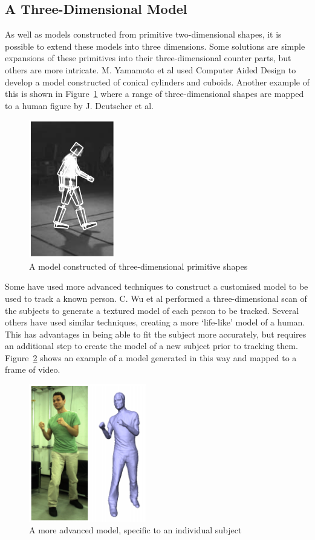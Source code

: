 \subsection{A Three-Dimensional Model}

As well as models constructed from primitive two-dimensional shapes, it is possible to extend these models into three dimensions. Some solutions are simple expansions of these primitives into their three-dimensional counter parts, but others are more intricate. M. Yamamoto et al used Computer Aided Design to develop a model constructed of conical cylinders and cuboids\cite{cadmodel}. Another example of this is shown in Figure~\ref{fig:3dmodelajd} where a range of three-dimensional shapes are mapped to a human figure by J. Deutscher et al.

\begin{figure}[H]
    \centering
    \includegraphics[height=6cm]{background/images/3dpolygon}

	\caption{A model constructed of three-dimensional primitive shapes\cite{stickfigure}}
	\label{fig:3dmodelajd}
\end{figure}

Some have used more advanced techniques to construct a customised model to be used to track a known person. C. Wu et al performed a three-dimensional scan of the subjects to generate a textured model of each person to be tracked\cite{capturystereopaper}. Several others have used similar techniques, creating a more `life-like' model of a human. This has advantages in being able to fit the subject more accurately, but requires an additional step to create the model of a new subject prior to tracking them. Figure~\ref{fig:3dtexturedmodel} shows an example of a model generated in this way and mapped to a frame of video.

\begin{figure}[H]
    \centering
    \includegraphics[height=6cm]{background/images/3dtexture}

	\caption{A more advanced model, specific to an individual subject\cite{capturystereopaper}}
	\label{fig:3dtexturedmodel}
\end{figure}
